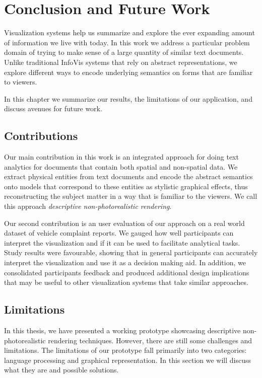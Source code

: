 \chapter{Conclusion and Future Work}
Visualization systems help us summarize and explore the ever expanding amount of
information we live with today. In this work we address a particular problem
domain of trying to make sense of a large quantity of similar text documents. Unlike
traditional InfoVis systems that rely on abstract representations, we explore different ways
to encode underlying semantics on \threed forms that are familiar to viewers. 

In this chapter we summarize our results, the limitations of our
application, and discuss avenues for future work.


\section{Contributions}
Our main contribution in this work is an integrated approach for doing text
analytics for documents that contain both spatial and non-spatial data. We extract
physical entities from text documents and encode the abstract semantics onto 
\threed models that correspond to these entities as stylistic graphical effects, thus 
reconstructing the subject matter in a way that is familiar to the viewers. We call
this approach \emph{descriptive non-photorealistic rendering}.

Our second contribution is an user evaluation of our approach on a real world dataset 
of vehicle complaint reports. We gauged how well participants can interpret the \threed 
visualization and if it can be used to facilitate analytical tasks. Study results were favourable, 
showing that in general participants can accurately interpret the visualization and use it as a
decision making aid. In addition, we consolidated participants feedback and produced additional 
design implications that may be useful to other visualization systems that take similar approaches.



\section{Limitations}
In this thesis, we have presented a working prototype showcasing descriptive
non-photorealistic rendering techniques. However, there are still some
challenges and limitations. The limitations of our prototype fall primarily into two
categories: language processing and graphical representation. In this section we
will discuss what they are and possible solutions.


